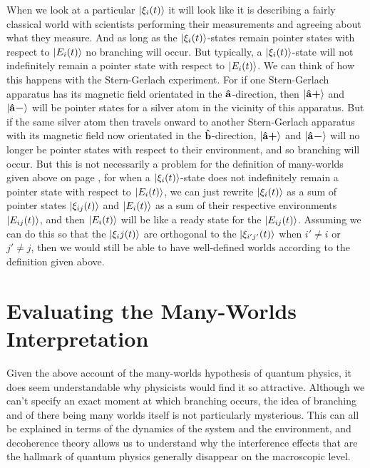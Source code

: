 \documentclass[letter, 12pt]{turabian-thesis}
\theoremstyle{hypothesis}
\newcommand{\uvb}[1]{\vb{\hat{{#1}}}}
\newcommand{\uvbp}[1]{\uvb{#1}\bm{+}}
\newcommand{\uvbm}[1]{\uvb{#1}\bm{-}}
\begin{document}
When we look at a particular $\ket{\xi_i(t)}$ it will look like it is describing a fairly classical world with scientists performing their measurements and agreeing about what they measure. And as long as the $\ket{\xi_i(t)}$-states remain pointer states with respect to $\ket{E_i(t)}$ no branching will occur. But typically, a $\ket{\xi_i(t)}$-state will not indefinitely remain a pointer state with respect to $\ket{E_i(t)}$. We can think of how this happens with the Stern-Gerlach experiment. For if one Stern-Gerlach apparatus has its magnetic field orientated in the $\uvb{a}$-direction, then $\ket{\uvbp{a}}$ and $\ket{\uvbm{a}}$ will be pointer states for a silver atom in the vicinity of this apparatus. But if the same silver atom then travels onward to another Stern-Gerlach apparatus with its magnetic field now orientated in the $\uvb{b}$-direction, $\ket{\uvbp{a}}$ and $\ket{\uvbm{a}}$ will no longer be pointer states with respect to their environment, and so branching will occur. But this is not necessarily a problem for the definition of many-worlds given above on page \pageref{rigorousworld}, for when a $\ket{\xi_i(t)}$-state does not indefinitely remain a pointer state with respect to $\ket{E_i(t)}$, we can just rewrite $\ket{\xi_i(t)}$ as a sum of pointer states $\ket{\xi_{ij}(t)}$ and $\ket{E_i(t)}$  as a sum of their respective environments $\ket{E_{ij}(t)}$, and then $\ket{E_i(t)}$ will be like a ready state for the $\ket{E_{ij}(t)}$. Assuming we can do this so that the $\ket{\xi_ij(t)}$ are orthogonal to the $\ket{\xi_{i'j'}(t)}$ when $i'\neq i$ or $j'\neq j$, then we would still be able to have well-defined worlds according to the definition given above.


\section{Evaluating the Many-Worlds Interpretation}\label{manyworldsinterpretation2}
Given the above account of the many-worlds hypothesis of quantum physics, it does seem understandable why physicists would find it so attractive. Although we can't specify an exact moment at which branching occurs, the idea of branching and of there being many worlds itself is not particularly mysterious. This can all be explained in terms of the dynamics of the system and the environment, and decoherence theory allows us to understand why the interference effects that are the hallmark of quantum physics generally disappear on the macroscopic level. 
\end{document}
